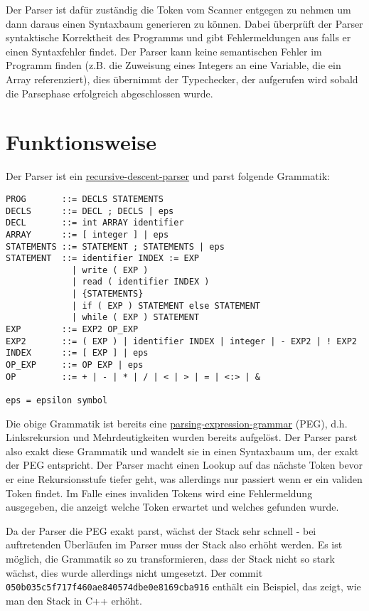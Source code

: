 \documentclass[a4paper,11pt,titlepage,openany,oneside]{scrbook}
\begin{document}
Der Parser ist dafür zuständig die Token vom Scanner entgegen zu nehmen um dann daraus einen Syntaxbaum generieren zu können. Dabei überprüft der Parser syntaktische Korrektheit des Programms und gibt Fehlermeldungen aus falls er einen Syntaxfehler findet. Der Parser kann keine semantischen Fehler im Programm finden (z.B. die Zuweisung eines Integers an eine Variable, die ein Array referenziert), dies übernimmt der Typechecker, der aufgerufen wird sobald die Parsephase erfolgreich abgeschlossen wurde.

\section{Funktionsweise}
Der Parser ist ein \href{http://en.wikipedia.org/wiki/Recursive_descent_parser}{recursive-descent-parser} und parst folgende Grammatik:

\begin{verbatim}
PROG       ::= DECLS STATEMENTS
DECLS      ::= DECL ; DECLS | eps
DECL       ::= int ARRAY identifier
ARRAY      ::= [ integer ] | eps
STATEMENTS ::= STATEMENT ; STATEMENTS | eps
STATEMENT  ::= identifier INDEX := EXP
             | write ( EXP )
             | read ( identifier INDEX )
             | {STATEMENTS}
             | if ( EXP ) STATEMENT else STATEMENT
             | while ( EXP ) STATEMENT
EXP        ::= EXP2 OP_EXP
EXP2       ::= ( EXP ) | identifier INDEX | integer | - EXP2 | ! EXP2
INDEX      ::= [ EXP ] | eps
OP_EXP     ::= OP EXP | eps
OP         ::= + | - | * | / | < | > | = | <:> | &

eps = epsilon symbol
\end{verbatim}

Die obige Grammatik ist bereits eine \href{http://en.wikipedia.org/wiki/Parsing_expression_grammar}{parsing-expression-grammar} (PEG), d.h. Linksrekursion und Mehrdeutigkeiten wurden bereits aufgelöst. Der Parser parst also exakt diese Grammatik und wandelt sie in einen Syntaxbaum um, der exakt der PEG entspricht. Der Parser macht einen Lookup auf das nächste Token bevor er eine Rekursionsstufe tiefer geht, was allerdings nur passiert wenn er ein validen Token findet. Im Falle eines invaliden Tokens wird eine Fehlermeldung ausgegeben, die anzeigt welche Token erwartet und welches gefunden wurde.

Da der Parser die PEG exakt parst, wächst der Stack sehr schnell - bei auftretenden Überläufen im Parser muss der Stack also erhöht werden. Es ist möglich, die Grammatik so zu transformieren, dass der Stack nicht so stark wächst, dies wurde allerdings nicht umgesetzt. Der commit \texttt{050b035c5f717f460ae840574dbe0e8169cba916} enthält ein Beispiel, das zeigt, wie man den Stack in C++ erhöht.
\end{document}
